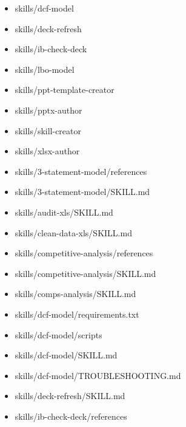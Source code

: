 \documentclass[11pt]{article}
\begin{document}
\begin{itemize}[leftmargin=*,itemsep=1pt,topsep=2pt]
\item \hspace*{0.9em}skills/dcf-model
\item \hspace*{0.9em}skills/deck-refresh
\item \hspace*{0.9em}skills/ib-check-deck
\item \hspace*{0.9em}skills/lbo-model
\item \hspace*{0.9em}skills/ppt-template-creator
\item \hspace*{0.9em}skills/pptx-author
\item \hspace*{0.9em}skills/skill-creator
\item \hspace*{0.9em}skills/xlsx-author
\item \hspace*{1.8em}skills/3-statement-model/references
\item \hspace*{1.8em}skills/3-statement-model/SKILL.md
\item \hspace*{1.8em}skills/audit-xls/SKILL.md
\item \hspace*{1.8em}skills/clean-data-xls/SKILL.md
\item \hspace*{1.8em}skills/competitive-analysis/references
\item \hspace*{1.8em}skills/competitive-analysis/SKILL.md
\item \hspace*{1.8em}skills/comps-analysis/SKILL.md
\item \hspace*{1.8em}skills/dcf-model/requirements.txt
\item \hspace*{1.8em}skills/dcf-model/scripts
\item \hspace*{1.8em}skills/dcf-model/SKILL.md
\item \hspace*{1.8em}skills/dcf-model/TROUBLESHOOTING.md
\item \hspace*{1.8em}skills/deck-refresh/SKILL.md
\item \hspace*{1.8em}skills/ib-check-deck/references

\end{itemize}
\end{document}
